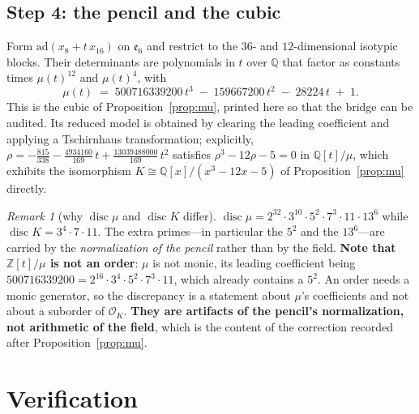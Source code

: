 \documentclass[11pt,reqno]{amsart}
\theoremstyle{plain}
\theoremstyle{definition}
\theoremstyle{remark}
\newtheorem{remark}[theorem]{Remark}
\newcommand{\Q}{\mathbb{Q}}
\newcommand{\Z}{\mathbb{Z}}
\newcommand{\ee}{\mathfrak{e}}
\newcommand{\disc}{\operatorname{disc}}
\begin{document}
\subsection*{Step 4: the pencil and the cubic}
Form $\mathrm{ad}(x_8+t\,x_{16})$ on $\ee_6$ and restrict to the $36$- and
$12$-dimensional isotypic blocks. Their determinants are polynomials in $t$ over $\Q$
that factor as constants times $\mu(t)^{12}$ and $\mu(t)^{4}$, with
\[
   \mu(t)\;=\;500716339200\,t^{3}\;-\;159667200\,t^{2}\;-\;28224\,t\;+\;1 .
\]
This is the cubic of Proposition~\ref{prop:mu}, printed here so that the bridge can be
audited. Its reduced model is obtained by clearing the leading coefficient and applying
a Tschirnhaus transformation; explicitly, $\rho=-\tfrac{815}{338}
-\tfrac{4934160}{169}\,t+\tfrac{13039488000}{169}\,t^{2}$ satisfies
$\rho^{3}-12\rho-5=0$ in $\Q[t]/\mu$, which exhibits the isomorphism
$K\cong\Q[x]/(x^{3}-12x-5)$ of Proposition~\ref{prop:mu} directly.

\begin{remark}[why $\disc\mu$ and $\disc K$ differ]\label{rem:discmu}
$\disc\mu=2^{32}\cdot3^{10}\cdot5^{2}\cdot7^{3}\cdot11\cdot13^{6}$ while
$\disc K=3^{4}\cdot7\cdot11$. The extra primes---in particular the $5^2$ and the
$13^6$---are carried by the \emph{normalization of the pencil} rather than by the field.
\textbf{Note that $\Z[t]/\mu$ is not an order}: $\mu$ is not monic, its leading
coefficient being $500716339200=2^{16}\cdot3^{4}\cdot5^{2}\cdot7^{3}\cdot11$, which
already contains a $5^2$. An order needs a monic generator, so the discrepancy is a
statement about $\mu$'s coefficients and not about a suborder of $\mathcal O_K$.
\textbf{They are artifacts of the pencil's normalization, not arithmetic of the field},
which is the content of the correction recorded after Proposition~\ref{prop:mu}.
\end{remark}

\section{Verification}\label{app:verify}
\end{document}
